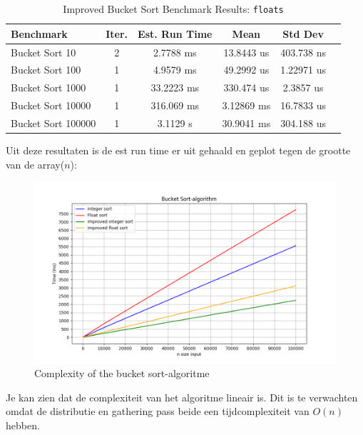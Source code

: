 \documentclass{article}
\begin{document}
\begin{table}[H]
  \caption{Improved Bucket Sort Benchmark Results:  \texttt{floats}}
  \label{tab:floats-detailed-new}
  \begin{tabular*}{\columnwidth}{@{\extracolsep\fill}lccccc}
    \hline
    Benchmark          & Iter. & Est. Run Time & Mean          & Std Dev       \\
    \hline
    Bucket Sort 10     & 2     & 2.7788 ms    & 13.8443 us    & 403.738 ns  \\
    Bucket Sort 100    & 1     & 4.9579 ms    & 49.2992 us    & 1.22971 us  \\
    Bucket Sort 1000   & 1     & 33.2223 ms   & 330.474 us    & 2.3857 us   \\
    Bucket Sort 10000  & 1     & 316.069 ms   & 3.12869 ms    & 16.7833 us  \\
    Bucket Sort 100000 & 1     & 3.1129 s     & 30.9041 ms    & 304.188 us  \\
    \hline
  \end{tabular*}
\end{table}

\newpage
Uit deze resultaten is de est run time er uit gehaald en geplot tegen de grootte van de array($n$):

\begin{figure}[H]
    \includegraphics[width=1\textwidth]{images/bucket_sort.png}
    \caption{Complexity of the bucket sort-algoritme}
    \label{fig:complexity}
\end{figure}
Je kan zien dat de complexiteit van het algoritme lineair is. Dit is te verwachten omdat de distributie en gathering pass beide een tijdcomplexiteit van \(O(n)\) hebben.
\end{document}
